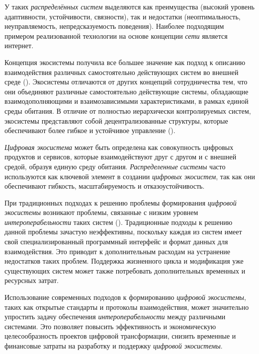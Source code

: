 У таких \textit{распределённых систем} выделяются как преимущества (высокий уровень адаптивности, устойчивости, связности), так и недостатки (неоптимальность, неуправляемость, непредсказуемость поведения). Наиболее подходящим примером реализованной технологии на основе концепции \textit{сети} является интернет.

Концепция экосистемы получила все большее значение как подход к описанию взаимодействия различных самостоятельно действующих систем во внешней среде (). Экосистемы отличаются от других концепций сотрудничества тем, что они объединяют различные самостоятельно действующие системы, обладающие взаимодополняющими и взаимозависимыми характеристиками, в рамках единой среды обитания. В отличие от полностью иерархически контролируемых систем, экосистемы представляют собой децентрализованные структуры, которые обеспечивают более гибкое и устойчивое управление ().

\textit{Цифровая экосистема} может быть определена как совокупность цифровых продуктов и сервисов, которые взаимодействуют друг с другом и с внешней средой, образуя единую среду обитания. \textit{Распределенные системы} часто используются как ключевой элемент в создании \textit{цифровых экосистем}, так как они обеспечивают гибкость, масштабируемость и отказоустойчивость.

При традиционных подходах к решению проблемы формирования \textit{цифровой экосистемы} возникают проблемы, связанные с низким уровнем \textit{интероперабельности} таких систем (). Традиционные подходы к решению данной проблемы зачастую неэффективны, поскольку каждая из систем имеет свой специализированный программный интерфейс и формат данных для взаимодействия. Это приводит к дополнительным расходам на устранение недостатков таких проблем. Поддержка жизненного цикла и модификация уже существующих систем может также потребовать дополнительных временных и ресурсных затрат.

Использование современных подходов к формированию \textit{цифровой экосистемы}, таких как открытые стандарты и протоколы взаимодействия, может значительно упростить задачу обеспечения \textit{интероперабельности} между различными системами. Это позволяет повысить эффективность и экономическую целесообразность проектов цифровой трансформации, снизить временные и финансовые затраты на разработку и поддержку \textit{цифровой экосистемы}.
